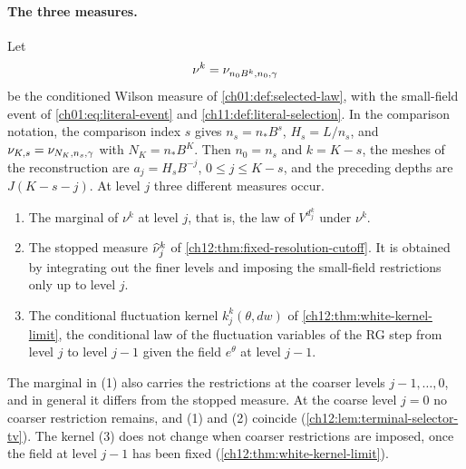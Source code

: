 \paragraph{The three measures.}
Let
\[
 \nu^k=\nu_{n_0B^k,n_0,\gamma}
\]
be the conditioned Wilson measure of \cref{ch01:def:selected-law}, with the small-field event of \cref{ch01:eq:literal-event} and \cref{ch11:def:literal-selection}. In the comparison notation, the comparison index $s$ gives $n_s=n_*B^s$, $H_s=L/n_s$, and $\nu_{K,s}=\nu_{N_K,n_s,\gamma}$ with $N_K=n_*B^K$. Then $n_0=n_s$ and $k=K-s$, the meshes of the reconstruction are $a_j=H_sB^{-j}$, $0\le j\le K-s$, and the preceding depths are $J(K-s-j)$. At level $j$ three different measures occur.
\begin{enumerate}
\item The marginal of $\nu^k$ at level $j$, that is, the law of $V^{d_j^k}$ under $\nu^k$.
\item The stopped measure $\widehat\nu_j^k$ of \cref{ch12:thm:fixed-resolution-cutoff}. It is obtained by integrating out the finer levels and imposing the small-field restrictions only up to level $j$.
\item The conditional fluctuation kernel $k_j^k(\theta,dw)$ of \cref{ch12:thm:white-kernel-limit}, the conditional law of the fluctuation variables of the RG step from level $j$ to level $j-1$ given the field $e^\theta$ at level $j-1$.
\end{enumerate}
The marginal in (1) also carries the restrictions at the coarser levels $j-1,\ldots,0$, and in general it differs from the stopped measure. At the coarse level $j=0$ no coarser restriction remains, and (1) and (2) coincide (\cref{ch12:lem:terminal-selector-tv}). The kernel (3) does not change when coarser restrictions are imposed, once the field at level $j-1$ has been fixed (\cref{ch12:thm:white-kernel-limit}).

